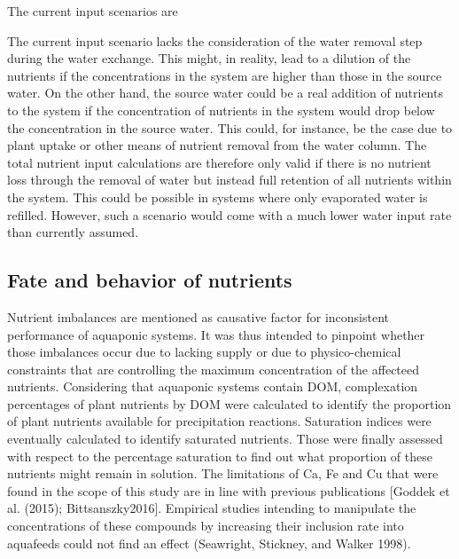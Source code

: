 \documentclass[
]{article}
\begin{document}
The current input scenarios are

The current input scenario lacks the consideration of the water removal step during the water exchange. This might, in reality, lead to a dilution of the nutrients if the concentrations in the system are higher than those in the source water. On the other hand, the source water could be a real addition of nutrients to the system if the concentration of nutrients in the system would drop below the concentration in the source water. This could, for instance, be the case due to plant uptake or other means of nutrient removal from the water column.
The total nutrient input calculations are therefore only valid if there is no nutrient loss through the removal of water but instead full retention of all nutrients within the system. This could be possible in systems where only evaporated water is refilled. However, such a scenario would come with a much lower water input rate than currently assumed.

\hypertarget{fate-and-behavior-of-nutrients-2}{%
\subsection{Fate and behavior of nutrients}\label{fate-and-behavior-of-nutrients-2}}

Nutrient imbalances are mentioned as causative factor for inconsistent performance of aquaponic systems. It was thus intended to pinpoint whether those imbalances occur due to lacking supply or due to physico-chemical constraints that are controlling the maximum concentration of the affecteed nutrients. Considering that aquaponic systems contain DOM, complexation percentages of plant nutrients by DOM were calculated to identify the proportion of plant nutrients available for precipitation reactions. Saturation indices were eventually calculated to identify saturated nutrients. Those were finally assessed with respect to the percentage saturation to find out what proportion of these nutrients might remain in solution.
The limitations of Ca, Fe and Cu that were found in the scope of this study are in line with previous publications {[}Goddek et al. (2015); Bittsanszky2016{]}. Empirical studies intending to manipulate the concentrations of these compounds by increasing their inclusion rate into aquafeeds could not find an effect (Seawright, Stickney, and Walker 1998).
\end{document}
